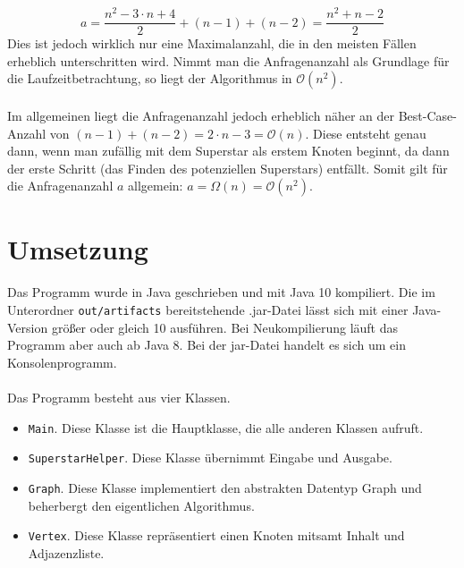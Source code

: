 \documentclass[a4paper, notitlepage, 12pt]{scrartcl}
\begin{document}
\begin{equation*}
  a = \frac{n^{2} - 3 \cdot n + 4}{2} + (n - 1) + (n - 2) = \frac{n^{2} + n - 2}{2}
\end{equation*}
Dies ist jedoch wirklich nur eine Maximalanzahl, die in den meisten Fällen erheblich unterschritten wird. Nimmt man die Anfragenanzahl als Grundlage für die Laufzeitbetrachtung, so liegt der Algorithmus in $\mathcal{O}(n^{2})$. \\ \\
Im allgemeinen liegt die Anfragenanzahl jedoch erheblich näher an der Best-Case-Anzahl von $(n - 1) + (n - 2) = 2 \cdot n - 3 = \mathcal{O}(n)$. Diese entsteht genau dann, wenn man zufällig mit dem Superstar als erstem Knoten beginnt, da dann der erste Schritt (das Finden des potenziellen Superstars) entfällt. Somit gilt für die Anfragenanzahl $a$ allgemein: $a = \Omega(n) = \mathcal{O}(n^{2})$.

\section{Umsetzung}
Das Programm wurde in Java geschrieben und mit Java 10 kompiliert. Die im Unterordner \texttt{out/artifacts} bereitstehende .jar-Datei lässt sich mit einer Java-Version größer oder gleich 10 ausführen. Bei Neukompilierung läuft das Programm aber auch ab Java 8. Bei der jar-Datei handelt es sich um ein Konsolenprogramm. \\ \\
Das Programm besteht aus vier Klassen.
\begin{itemize}
  \item \texttt{Main}. Diese Klasse ist die Hauptklasse, die alle anderen Klassen aufruft.
  \item \texttt{SuperstarHelper}. Diese Klasse übernimmt Eingabe und Ausgabe.
  \item \texttt{Graph}. Diese Klasse implementiert den abstrakten Datentyp Graph und beherbergt den eigentlichen Algorithmus.
  \item \texttt{Vertex}. Diese Klasse repräsentiert einen Knoten mitsamt Inhalt und Adjazenzliste.
\end{itemize}
\end{document}
